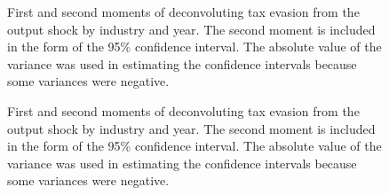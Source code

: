 \documentclass[
  12pt]{article}
\theoremstyle{definition}
\theoremstyle{remark}
\begin{document}
\begin{figure}


\caption{\label{fig-deconv-mmt-year-1}First and second moments of
deconvoluting tax evasion from the output shock by industry and year.
The second moment is included in the form of the 95\% confidence
interval. The absolute value of the variance was used in estimating the
confidence intervals because some variances were negative.}

\end{figure}%

\begin{figure}


\caption{\label{fig-deconv-mmt-year-2}First and second moments of
deconvoluting tax evasion from the output shock by industry and year.
The second moment is included in the form of the 95\% confidence
interval. The absolute value of the variance was used in estimating the
confidence intervals because some variances were negative.}

\end{figure}%
\end{document}
